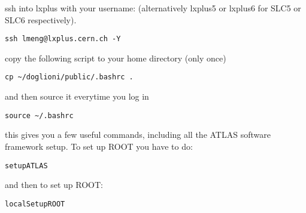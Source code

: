 ssh into lxplus with your username: (alternatively lxplus5 or lxplus6 for SLC5 or SLC6 respectively).

\lstinline|ssh lmeng@lxplus.cern.ch -Y|

copy the following script to your home directory (only once)

\lstinline|cp ~/doglioni/public/.bashrc .|

and then source it everytime you log in

\lstinline|source ~/.bashrc|

this gives you a few useful commands, including all the ATLAS software framework setup. To set up ROOT you have to do:

\lstinline|setupATLAS|

and then to set up ROOT:

\lstinline|localSetupROOT|


